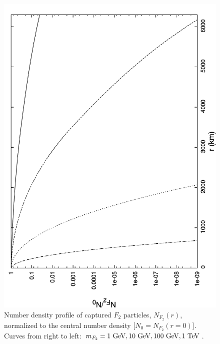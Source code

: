 \documentclass[12pt]{article}
\begin{document}
%
\begin{figure}[htpb]
    \centering
        \includegraphics[scale=0.5, angle=270]{fig1}
    \caption{Number density profile of captured $F_2$ particles, $N _{F _2} (r)$, normalized to the central number density [$N _0 = N _{F _2} (r=0)$]. Curves from right to left: $m _{F_2} = 1 \ {\rm GeV}, 10 \ {\rm GeV}, 100 \ {\rm GeV}, 1 \ {\rm TeV}$.}
    \label{fig:nr}
\vskip 0.8cm
\end{figure}
%
\end{document}
